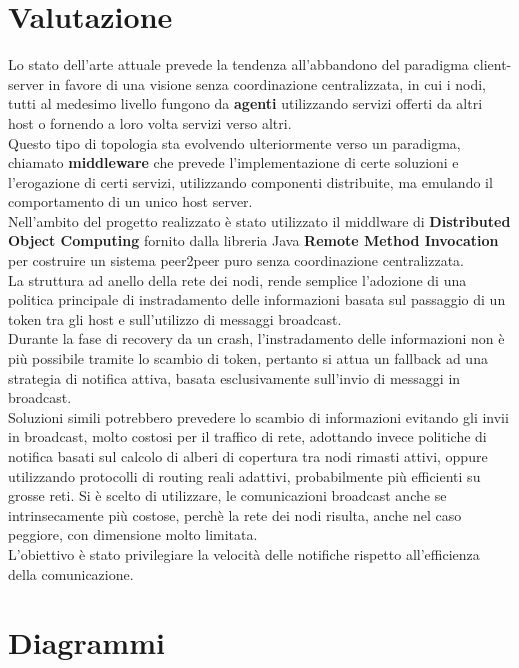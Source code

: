 \documentclass[10pt,a4paper]{article}
\begin{document}
\section{Valutazione}
Lo stato dell'arte attuale prevede la tendenza all'abbandono del paradigma client-server in favore di una visione senza coordinazione centralizzata, in cui i nodi, tutti al medesimo livello fungono da \textbf{agenti} utilizzando servizi offerti da altri host o fornendo a loro volta servizi verso altri.\\ Questo tipo di topologia sta evolvendo ulteriormente verso un paradigma, chiamato \textbf{middleware} che prevede l'implementazione di certe soluzioni e l'erogazione di certi servizi, utilizzando componenti distribuite, ma emulando il comportamento di un unico host server. \\ Nell'ambito del progetto realizzato è stato utilizzato il middlware di \textbf{Distributed Object Computing} fornito dalla libreria Java \textbf{Remote Method Invocation} per costruire un sistema peer2peer puro senza coordinazione centralizzata.\\La struttura ad anello della rete dei nodi, rende semplice l'adozione di una politica principale di instradamento delle informazioni basata sul passaggio di un token tra gli host e sull'utilizzo di messaggi broadcast.\\ Durante la fase di recovery da un crash, l'instradamento delle informazioni non è più possibile tramite lo scambio di token, pertanto si attua un fallback ad una strategia di notifica attiva, basata esclusivamente sull'invio di messaggi in broadcast.\\ Soluzioni simili potrebbero prevedere lo scambio di informazioni evitando gli invii in broadcast, molto costosi per il traffico di rete, adottando invece politiche di notifica basati sul calcolo di alberi di copertura tra nodi rimasti attivi, oppure utilizzando protocolli di routing reali adattivi, probabilmente più efficienti su grosse reti. Si è scelto di utilizzare, le comunicazioni broadcast anche se intrinsecamente più costose, perchè la rete dei nodi risulta, anche nel caso peggiore, con dimensione molto limitata.\\ L'obiettivo è stato privilegiare la velocità delle notifiche rispetto all'efficienza della comunicazione.


\section{Diagrammi}
\end{document}
